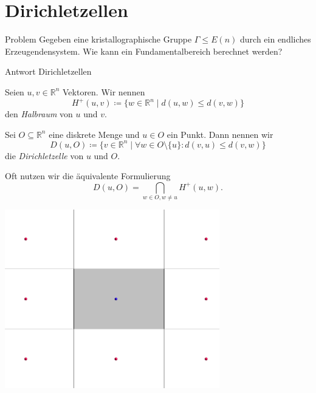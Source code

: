\documentclass{beamer}
\theoremstyle{plain}
\newcommand\R{\mathbb R}
\begin{document}
\section{Dirichletzellen}
\begin{frame}
    \begin{alertblock}{Problem}
        Gegeben eine kristallographische Gruppe $\Gamma \leq E(n)$ durch ein endliches Erzeugendensystem. Wie kann ein Fundamentalbereich berechnet werden?
    \end{alertblock}
    \pause
    \begin{exampleblock}{Antwort}
        Dirichletzellen
    \end{exampleblock}
\end{frame}

\begin{frame}
    \begin{definition}
        Seien $u, v \in \R^n$ Vektoren. Wir nennen
        $$
            H^+(u, v) \coloneqq \{ w \in \R^n \mid d(u,w) \leq d(v, w) \}
        $$
        den \emph{Halbraum} von $u$ und $v$.
    \end{definition}
    \pause
    \begin{definition}
        Sei $O \subseteq \R^n$ eine diskrete Menge und $u \in O$ ein Punkt.
        Dann nennen wir 
        $$
		    D(u, O) \coloneqq \{ v \in \R^n \mid \forall w \in O \setminus \{ u \} : d(v, u) \leq d(v, w) \}
	    $$
        die \emph{Dirichletzelle} von $u$ und $O$.
    \end{definition} \pause
    Oft nutzen wir die äquivalente Formulierung
    $$
		D(u, O) = \bigcap_{w \in O, w \neq u} H^+(u, w).
	$$
\end{frame}

\begin{frame}
    \centering
    \includegraphics[width=0.7\textwidth]{images/dirichlet-example.png}
\end{frame}
\end{document}
